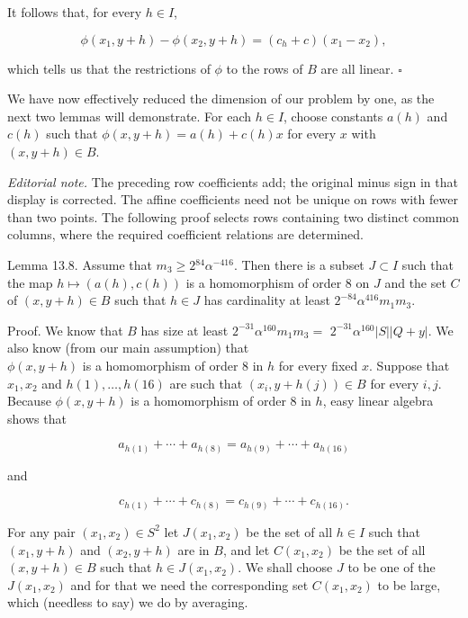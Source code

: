 \documentclass[10pt]{article}
\begin{document}
It follows that, for every $h \in I$,

$$
\phi\left(x_{1}, y+h\right)-\phi\left(x_{2}, y+h\right)=\left(c_{h}+c\right)\left(x_{1}-x_{2}\right),
$$

which tells us that the restrictions of $\phi$ to the rows of $B$ are all linear. \(\square\)

We have now effectively reduced the dimension of our problem by one, as the next two lemmas will demonstrate. For each $h \in I$, choose constants $a(h)$ and $c(h)$ such that $\phi(x, y+h)=a(h)+c(h) x$ for every $x$ with $(x, y+h) \in B$.

\emph{Editorial note.} The preceding row coefficients add; the original minus sign in that display is corrected. The affine coefficients need not be unique on rows
with fewer than two points. The following proof selects rows containing two
distinct common columns, where the required coefficient relations are determined.

Lemma 13.8. Assume that $m_{3} \geqslant 2{ }^{84} \alpha^{-416}$. Then there is a subset $J \subset I$ such that the map $h \mapsto(a(h), c(h))$ is a homomorphism of order 8 on $J$ and the set $C$ of $(x, y+h) \in B$ such that $h \in J$ has cardinality at least $2^{-84} \alpha^{416} m_{1} m_{3}$.

Proof. We know that $B$ has size at least $2^{-31} \alpha^{160} m_{1} m_{3}=$ $2^{-31} \alpha^{160}|S||Q+y|$. We also know (from our main assumption) that\\
$\phi(x, y+h)$ is a homomorphism of order 8 in $h$ for every fixed $x$. Suppose that $x_{1}, x_{2}$ and $h(1), \ldots, h(16)$ are such that $\left(x_{i}, y+h(j)\right) \in B$ for every $i, j$. Because $\phi(x, y+h)$ is a homomorphism of order 8 in $h$, easy linear algebra shows that

$$
a_{h(1)}+\cdots+a_{h(8)}=a_{h(9)}+\cdots+a_{h(16)}
$$

and

$$
c_{h(1)}+\cdots+c_{h(8)}=c_{h(9)}+\cdots+c_{h(16)} .
$$

For any pair $\left(x_{1}, x_{2}\right) \in S^{2}$ let $J\left(x_{1}, x_{2}\right)$ be the set of all $h \in I$ such that $\left(x_{1}, y+h\right)$ and $\left(x_{2}, y+h\right)$ are in $B$, and let $C\left(x_{1}, x_{2}\right)$ be the set of all $(x, y+h) \in B$ such that $h \in J\left(x_{1}, x_{2}\right)$. We shall choose $J$ to be one of the $J\left(x_{1}, x_{2}\right)$ and for that we need the corresponding set $C\left(x_{1}, x_{2}\right)$ to be large, which (needless to say) we do by averaging.
\end{document}
